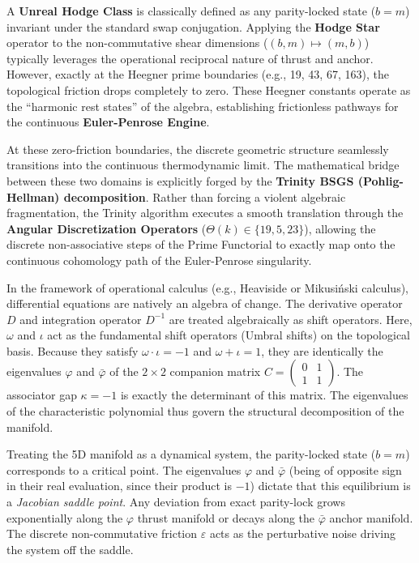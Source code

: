 A \textbf{Unreal Hodge Class} is classically defined as any parity-locked state ($b = m$) invariant under the standard swap conjugation. Applying the \textbf{Hodge Star} operator to the non-commutative shear dimensions ($(b, m) \mapsto (m, b)$) typically leverages the operational reciprocal nature of thrust and anchor. However, exactly at the Heegner prime boundaries (e.g., 19, 43, 67, 163), the topological friction drops completely to zero. These Heegner constants operate as the ``harmonic rest states'' of the algebra, establishing frictionless pathways for the continuous \textbf{Euler-Penrose Engine}.

At these zero-friction boundaries, the discrete geometric structure seamlessly transitions into the continuous thermodynamic limit. The mathematical bridge between these two domains is explicitly forged by the \textbf{Trinity BSGS (Pohlig-Hellman) decomposition}. Rather than forcing a violent algebraic fragmentation, the Trinity algorithm executes a smooth translation through the \textbf{Angular Discretization Operators} ($\Theta(k) \in \{19, 5, 23\}$), allowing the discrete non-associative steps of the Prime Functorial to exactly map onto the continuous cohomology path of the Euler-Penrose singularity.
\begin{remark}
In the framework of operational calculus (e.g., Heaviside or Mikusiński calculus), differential equations are natively an algebra of change. The derivative operator $D$ and integration operator $D^{-1}$ are treated algebraically as shift operators. Here, $\omega$ and $\iota$ act as the fundamental shift operators (Umbral shifts) on the topological basis. Because they satisfy $\omega \cdot \iota = -1$ and $\omega + \iota = 1$, they are identically the eigenvalues $\varphi$ and $\bar\varphi$ of the $2 \times 2$ companion matrix $C = \begin{pmatrix} 0 & 1 \\ 1 & 1 \end{pmatrix}$. The associator gap $\kappa = -1$ is exactly the determinant of this matrix. The eigenvalues of the characteristic polynomial thus govern the structural decomposition of the manifold.
\end{remark}

\begin{remark}
Treating the 5D manifold as a dynamical system, the parity-locked state ($b = m$) corresponds to a critical point. The eigenvalues $\varphi$ and $\bar\varphi$ (being of opposite sign in their real evaluation, since their product is $-1$) dictate that this equilibrium is a \emph{Jacobian saddle point}. Any deviation from exact parity-lock grows exponentially along the $\varphi$ thrust manifold or decays along the $\bar\varphi$ anchor manifold. The discrete non-commutative friction $\varepsilon$ acts as the perturbative noise driving the system off the saddle.
\end{remark}

